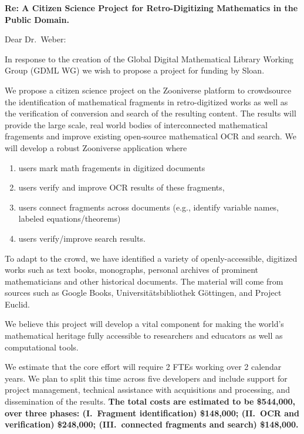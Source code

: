 \documentclass[10pt,letterpaper]{article}
\begin{document}
\thispagestyle{empty}

\noindent\textbf{Re: \quad A Citizen Science Project for Retro-Digitizing
Mathematics in the Public Domain.}

\bigskip

\noindent Dear Dr.~Weber:

\bigskip

In response to the creation of the Global Digital Mathematical 
Library Working Group (GDML WG) we wish to propose a 
project for funding by Sloan. 

We propose a citizen science project on the Zooniverse platform to 
crowdsource the identification of mathematical fragments in retro-digitized 
works as well as the verification of conversion and search of the resulting 
content. The results will provide the large scale, real world bodies of 
interconnected mathematical fragements and improve existing open-source 
mathematical OCR and search. We will develop a robust Zooniverse application 
where

\begin{enumerate}
\item users mark math fragements in digitized documents 
\item users verify and improve OCR results of these fragments,
\item users connect fragments across documents (e.g., 
identify variable names, labeled equations/theorems) 
\item users verify/improve search results. 
\end{enumerate}

To adapt to the crowd, we have identified a 
variety of openly-accessible, digitized works such as text books, monographs, 
personal archives of prominent mathematicians and other historical documents. 
The material will come from sources such as Google Books, 
Universit\"atsbibliothek G\"ottingen, and Project Euclid.

We believe this project will develop a vital component for making the world's 
mathematical heritage fully accessible to researchers and educators as well as 
computational tools.

We estimate that the core effort will require 2 FTEs
working over 2 calendar years.  We plan to split this time
across five developers and include support for project management,
technical assistance with acquisitions and processing, and
dissemination of the results.  \textbf{The total costs are estimated
  to be \$544,000, over three phases: (I.~Fragment identification)
  \$148,000; (II.~OCR and verification) \$248,000; (III.~connected fragments 
and search)
  \$148,000.}
\end{document}
